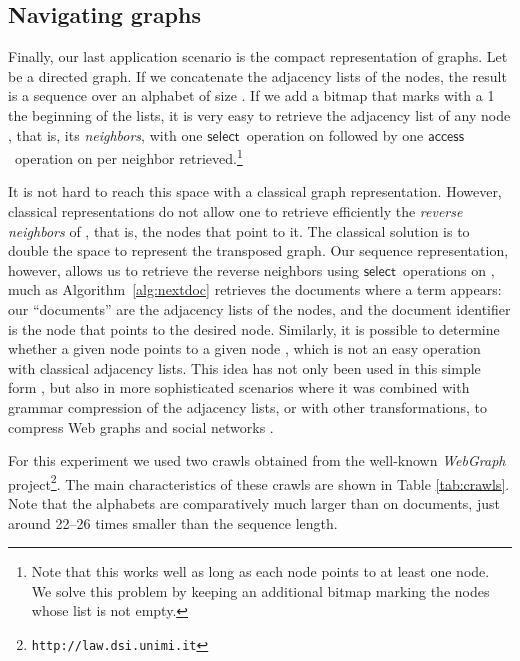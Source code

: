\documentclass[11pt]{article}
\newcommand{\access}
    {\ensuremath{\mathsf{access}}}
\newcommand{\select}
    {\ensuremath{\mathsf{select}}}
\begin{document}
\begin{table}[t]
{\begin{tabular}
\subsection{Navigating graphs}
\label{sec:exp-graph}

Finally, our last application scenario is the compact representation of
graphs. Let  be a directed graph. If we concatenate the adjacency
lists of the nodes, the result is a sequence  over an alphabet of
size . If we add a bitmap  that marks with a 1 the beginning
of the lists, it is very easy to retrieve the adjacency list of any node , that is, its {\em neighbors}, with one \select\ operation  on 
followed by one \access\ operation on  per neighbor
retrieved.\footnote{Note that this works well as long as each node points to
at least one node. We solve this problem by keeping an additional bitmap
marking the nodes whose list is not empty.}

It is not hard to reach this space with a classical graph representation.
However, classical representations do not allow one to retrieve efficiently the
{\em reverse neighbors} of , that is, the nodes that point to it. The
classical solution is to double the space to represent the transposed graph.
Our sequence representation, however, allows us to retrieve the reverse
neighbors using \select\ operations on , much as
Algorithm~\ref{alg:nextdoc} retrieves the documents where a term  appears:
our ``documents'' are the adjacency lists of the nodes, and the document
identifier is the node  that points to the desired node. Similarly,
it is possible to determine whether a given node  points to a given node
, which is not an easy operation with classical adjacency lists. This
idea has not only been used in this simple form \cite{CN08}, but also in 
more sophisticated scenarios where it was combined with grammar compression
of the adjacency lists, or with other transformations, to compress Web graphs 
and social networks \cite{CNtweb10,CNlncs10,HN11}.

For this experiment we used two crawls obtained from the well-known 
{\em WebGraph} project\footnote{{\tt http://law.dsi.unimi.it}}.
The main characteristics of these crawls are shown in Table \ref{tab:crawls}. 
Note that the alphabets are comparatively much larger than on documents,
just around 22--26 times smaller than the sequence length.


\end{tabular}}
\end{table}
\end{document}
